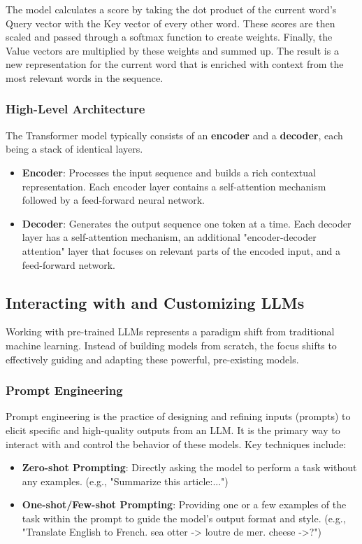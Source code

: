 \documentclass[11pt,a4paper]{article}
\begin{document}
The model calculates a score by taking the dot product of the current word's Query vector with the Key vector of every other word. These scores are then scaled and passed through a softmax function to create weights. Finally, the Value vectors are multiplied by these weights and summed up. The result is a new representation for the current word that is enriched with context from the most relevant words in the sequence.

\subsubsection{High-Level Architecture}

The Transformer model typically consists of an \textbf{encoder} and a \textbf{decoder}, each being a stack of identical layers.
\begin{itemize}
    \item \textbf{Encoder}: Processes the input sequence and builds a rich contextual representation. Each encoder layer contains a self-attention mechanism followed by a feed-forward neural network.
    \item \textbf{Decoder}: Generates the output sequence one token at a time. Each decoder layer has a self-attention mechanism, an additional "encoder-decoder attention" layer that focuses on relevant parts of the encoded input, and a feed-forward network.
\end{itemize}

\subsection{Interacting with and Customizing LLMs}

Working with pre-trained LLMs represents a paradigm shift from traditional machine learning. Instead of building models from scratch, the focus shifts to effectively guiding and adapting these powerful, pre-existing models.

\subsubsection{Prompt Engineering}

Prompt engineering is the practice of designing and refining inputs (prompts) to elicit specific and high-quality outputs from an LLM. It is the primary way to interact with and control the behavior of these models. Key techniques include:
\begin{itemize}
    \item \textbf{Zero-shot Prompting}: Directly asking the model to perform a task without any examples. (e.g., "Summarize this article:...")
    \item \textbf{One-shot/Few-shot Prompting}: Providing one or a few examples of the task within the prompt to guide the model's output format and style. (e.g., "Translate English to French. sea otter -> loutre de mer. cheese ->?")
\end{itemize}
\end{document}
